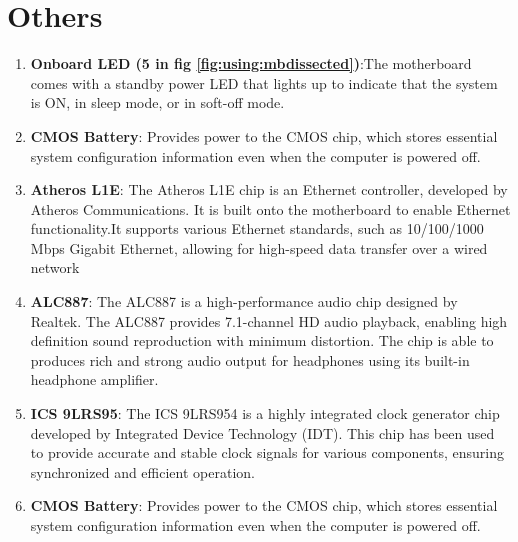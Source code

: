 \section{Others}
\begin{enumerate}
  \item \textbf{Onboard LED (5 in fig \ref{fig:using:mbdissected})}:The motherboard comes with a standby power LED that lights up to indicate that the system is ON, in sleep mode, or in soft-off mode.
  \item \textbf{CMOS Battery}: Provides power to the CMOS chip, which stores essential system configuration information even when the computer is powered off.
  \item \textbf{Atheros L1E}: The Atheros L1E chip is an Ethernet controller, developed by Atheros Communications. It is built onto the motherboard to enable Ethernet functionality.It supports various Ethernet standards, such as 10/100/1000 Mbps Gigabit Ethernet, allowing for high-speed data transfer over a wired network
    \item \textbf{ALC887}: The ALC887 is a high-performance audio chip designed by Realtek. The ALC887 provides 7.1-channel HD audio playback, enabling high definition sound reproduction with minimum distortion. The chip is able to produces rich and strong audio output for headphones using its built-in headphone amplifier.
      \item \textbf{ICS 9LRS95}: The ICS 9LRS954 is a highly integrated clock generator chip developed by Integrated Device Technology (IDT). This chip has been used to provide accurate and stable clock signals for various components, ensuring synchronized and efficient operation.
    \item \textbf{CMOS Battery}: Provides power to the CMOS chip, which stores essential system configuration information even when the computer is powered off.
\end{enumerate}
